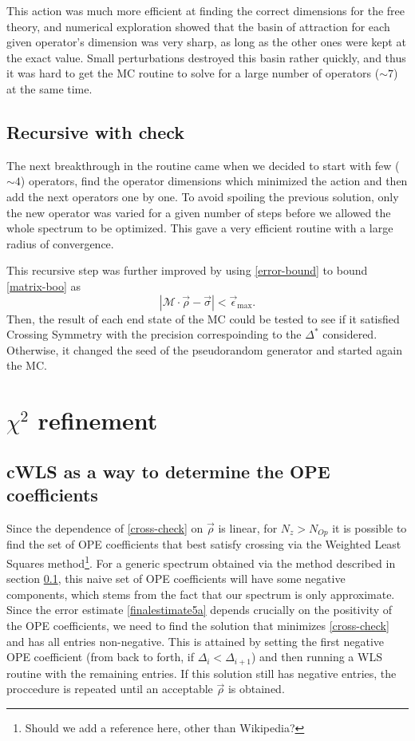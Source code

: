 \documentclass[letterpaper]{article}
\numberwithin{equation}{section}
\begin{document}
This action was much more efficient at finding the correct dimensions for the
free theory, and numerical exploration showed that the basin of attraction for
each given operator's dimension was very sharp, as long as the other ones were
kept at the exact value. Small perturbations destroyed this basin rather
quickly, and thus it was hard to get the MC routine to solve for a large number
of operators  ($\sim 7$) at the same time.

\subsection{Recursive with check}
\label{rec-check}

The next breakthrough in the routine came when we decided to start with few
($\sim 4$) operators, find the operator dimensions which minimized the 
action and then add the next operators one by one. To avoid spoiling
the previous solution, only the new operator was varied for a given number of
steps before we allowed the whole spectrum to be optimized. This gave a very
efficient routine with a large radius of convergence.

This recursive step was further improved by using
\ref{error-bound} to bound \ref{matrix-boo} as 
\begin{equation}
  | \mathcal{M}\cdot \vec{\rho}-\vec{\sigma} | < \vec{\epsilon}_{\mathrm{max}}.
  \label{cross-check}
\end{equation}
Then, the result of each end state of the MC could be tested to see if it
satisfied Crossing Symmetry with the precision correspoinding to the $\Delta^*$
considered. Otherwise, it changed the seed of the pseudorandom generator and
started again the MC.


\section{$\chi^2$ refinement}
\subsection{cWLS as a way to determine the OPE coefficients}
Since the dependence of \ref{cross-check} on $\vec{\rho}$ is linear, for
$N_z>N_{Op}$ it is possible to find the set of OPE coefficients that best
satisfy crossing via the Weighted Least Squares method\footnote{Should we add a
reference here, other than Wikipedia?}. 
For a generic spectrum
obtained via the method described in section \ref{rec-check}, this naive set of OPE
coefficients will have some negative components, which stems from the
fact that our spectrum is only approximate. Since the error estimate
\ref{finalestimate5a}
depends
crucially on the positivity of the OPE coefficients, we need to find the
solution that minimizes \ref{cross-check} and has all entries non-negative. This
is attained by setting the first negative OPE coefficient (from back to forth,
if $\Delta_i<\Delta_{i+1}$) and then running a WLS routine with the remaining
entries. If this solution still has negative entries, the proccedure is repeated
until an acceptable $\vec{\rho}$ is obtained.
\end{document}
